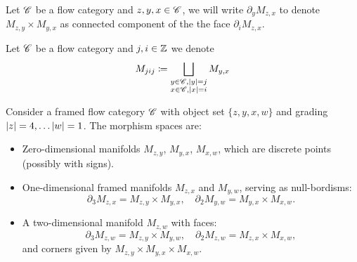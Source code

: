 \begin{notation}
    Let $\mathscr{C}$ be a flow category and $z,y,x \in \mathscr{C}$, we will write $\partial_y M_{z,x}$ to denote $M_{z,y} \times  M_{y,x}$ as connected component of the the face $\partial_i M_{z,x}$.
\end{notation}
\begin{notation}\label{not:unionFlowMfld}
    Let $\mathscr{C}$ be a flow category and $j,i \in \mathbb{Z}$ we denote
    \begin{equation*}
        M_{jij} \coloneqq \bigsqcup_{\substack{ y \in \mathscr{C}, \left\lvert y\right\rvert=j \\ x \in \mathscr{C}, \left\lvert x\right\rvert=i}} M_{y,x}
    \end{equation*}
\end{notation}

\begin{exmp}
Consider a framed flow category $\mathscr{C}$ with object set $\{ z, y, x, w \}$ and grading $\left\lvert z\right\rvert = 4, \dots \left\lvert w\right\rvert = 1$. The morphism spaces are:
\begin{itemize}
    \item Zero-dimensional manifolds $M_{z,y}$, $M_{y,x}$, $M_{x,w}$, which are discrete points (possibly with signs).
    \item One-dimensional framed manifolds $M_{z,x}$ and $M_{y,w}$, serving as null-bordisms:
    \begin{equation*}
        \partial_3 M_{z,x} = M_{z,y} \times M_{y,x}, \quad \partial_2 M_{y,w} = M_{y,x} \times M_{x,w}.
    \end{equation*}
    \item A two-dimensional manifold $M_{z,w}$ with faces:
    \begin{equation*}
        \partial_3 M_{z,w} = M_{z,y} \times M_{y,w}, \quad \partial_2 M_{z,w} = M_{z,x} \times M_{x,w},
    \end{equation*}
    and corners given by $M_{z,y} \times M_{y,x} \times M_{x,w}$.
\end{itemize}
\end{exmp}

